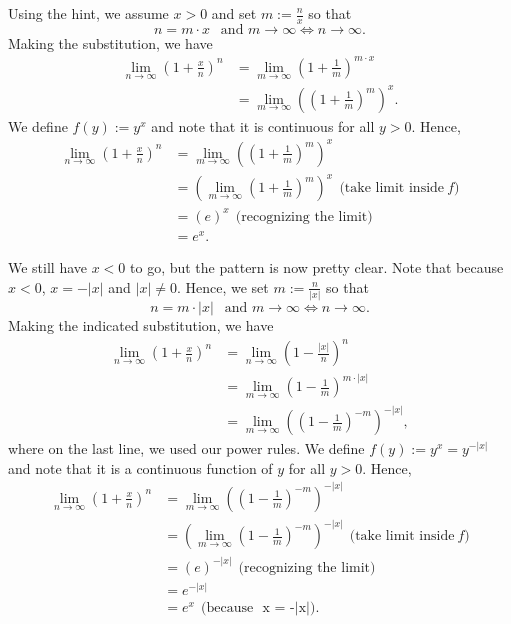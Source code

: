 \begin{enumerate}
Using the hint, we assume $x>0$ and set $m:=\frac{n}{x}$ so that 
$$ n = m \cdot x ~~\text{ and } m \to \infty \iff n \to \infty.$$
Making the substitution, we have
\begin{align*}
    \lim_{n \to \infty} \left( 1 + \frac{x}{n} \right)^n & = \lim_{m \to \infty} \left( 1 + \frac{1}{m} \right)^{m \cdot x} \\
    & =  \lim_{m \to \infty}  \left( \left( 1 + \frac{1}{m} \right)^{m} \right) ^x.
\end{align*}
We define $f(y):= y^x$ and note that it is continuous for all $y > 0$. Hence, 
\begin{align*}
    \lim_{n \to \infty} \left( 1 + \frac{x}{n} \right)^n & = \lim_{m \to \infty}  \left( \left( 1 + \frac{1}{m} \right)^{m} \right) ^x \\
    & =   \left( \lim_{m \to \infty}  \left( 1 + \frac{1}{m} \right)^{m} \right) ^x ~~\text{(take limit inside}~f) \\
    & = (e)^x ~~\text{(recognizing the limit)}\\
    & = e^x.
\end{align*}

We still have $x < 0$ to go, but the pattern is now pretty clear. Note that because $x < 0$, $x = -|x|$ and $|x| \neq 0$. Hence, we set $m:=\frac{n}{|x|}$ so that 
$$ n = m \cdot |x| ~~\text{ and } m \to \infty \iff n \to \infty.$$
Making the indicated substitution, we have
\begin{align*}
    \lim_{n \to \infty} \left( 1 + \frac{x}{n} \right)^n & = \lim_{n \to \infty} \left( 1 - \frac{|x|}{n} \right)^n \\
    & = \lim_{m \to \infty} \left( 1 - \frac{1}{m} \right)^{m \cdot |x|} \\
    & =  \lim_{m \to \infty}  \left( \left( 1 - \frac{1}{m} \right)^{-m} \right) ^{-|x|},
\end{align*}
where on the last line, we used our power rules. We define $f(y):= y^x = y^{-|x|}$ and note that it is a continuous function of $y$ for all $y > 0$. Hence, 
\begin{align*}
    \lim_{n \to \infty} \left( 1 + \frac{x}{n} \right)^n & = \lim_{m \to \infty}  \left( \left( 1 - \frac{1}{m} \right)^{-m} \right) ^ {-|x|} \\
    & =   \left( \lim_{m \to \infty}  \left( 1 - \frac{1}{m} \right)^{-m} \right) ^{-|x|} ~~\text{(take limit inside}~f) \\
    & = (e)^{-|x|} ~~\text{(recognizing the limit)}\\
    & = e^{-|x|} \\
    & = e^x ~~(\text{because~~x = -|x|)}.
\end{align*}


\end{enumerate}
